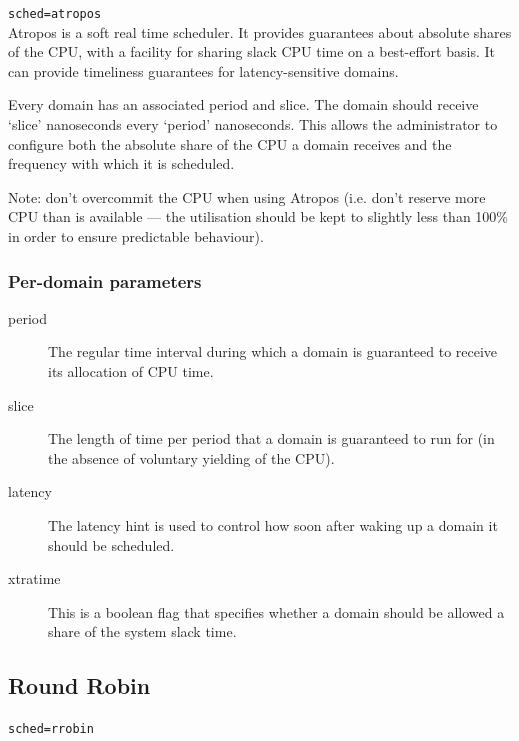 \documentclass[11pt,twoside,final,openright]{report}
\begin{document}
{{\tt sched=atropos} \\

Atropos is a soft real time scheduler.  It provides guarantees about
absolute shares of the CPU, with a facility for sharing
slack CPU time on a best-effort basis. It can provide timeliness
guarantees for latency-sensitive domains.

Every domain has an associated period and slice.  The domain should
receive `slice' nanoseconds every `period' nanoseconds.  This allows
the administrator to configure both the absolute share of the CPU a
domain receives and the frequency with which it is scheduled. 


Note: don't overcommit the CPU when using Atropos (i.e. don't reserve
more CPU than is available --- the utilisation should be kept to
slightly less than 100\% in order to ensure predictable behaviour).

\subsubsection{Per-domain parameters}

\begin{description}
\item[period] The regular time interval during which a domain is
  guaranteed to receive its allocation of CPU time.
\item[slice]
  The length of time per period that a domain is guaranteed to run
  for (in the absence of voluntary yielding of the CPU). 
\item[latency]
  The latency hint is used to control how soon after
  waking up a domain it should be scheduled.
\item[xtratime] This is a boolean flag that specifies whether a domain
  should be allowed a share of the system slack time.
\end{description}

\subsection{Round Robin}

{\tt sched=rrobin} \\

}
\end{document}
